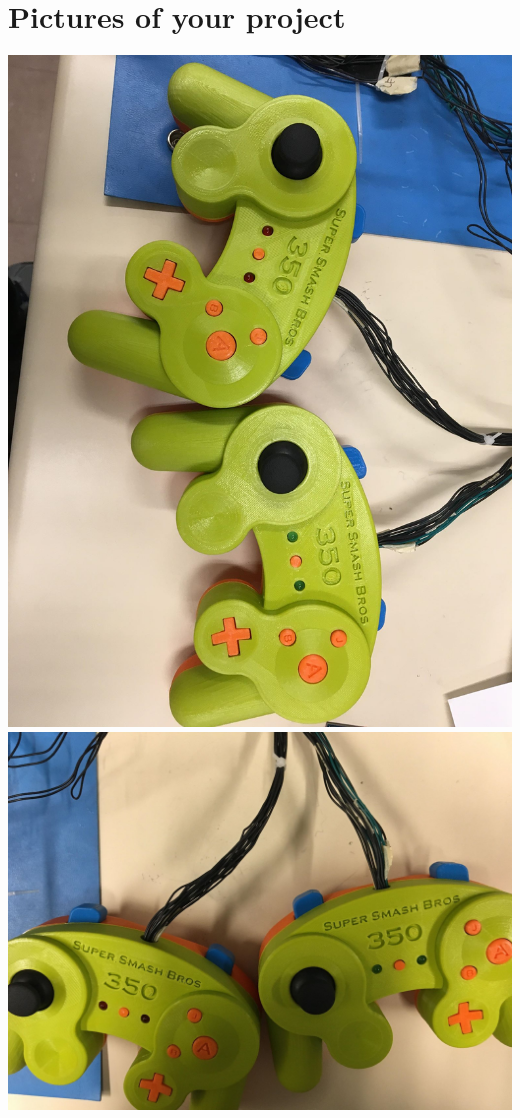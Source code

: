 \documentclass[12pt]{article} %
\begin{document}
\section{Pictures of your project}
\includegraphics[scale=0.1]{pic1}\\
\includegraphics[scale=0.1]{pic2}\\
\end{document}
